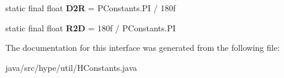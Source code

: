\begin{DoxyCompactItemize}
\item 
\hypertarget{interfacehype_1_1util_1_1_h_constants_a5ed71fb4b47e5babb0bba63b4bb0c5fa}{static final float {\bfseries D2\-R} = P\-Constants.\-P\-I / 180f}\label{interfacehype_1_1util_1_1_h_constants_a5ed71fb4b47e5babb0bba63b4bb0c5fa}

\item 
\hypertarget{interfacehype_1_1util_1_1_h_constants_a7ce3b8de220fac7fcd9c35758912dc90}{static final float {\bfseries R2\-D} = 180f / P\-Constants.\-P\-I}\label{interfacehype_1_1util_1_1_h_constants_a7ce3b8de220fac7fcd9c35758912dc90}

\end{DoxyCompactItemize}


The documentation for this interface was generated from the following file\-:\begin{DoxyCompactItemize}
\item 
java/src/hype/util/H\-Constants.\-java\end{DoxyCompactItemize}
